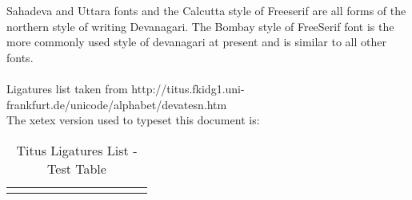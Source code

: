 \documentclass[a4paper,12pt]{memoir}
\begin{document}
\pagestyle{ruled}
\medskip
Sahadeva and Uttara fonts and the Calcutta style of Freeserif are all forms of the northern style  of writing Devanagari.  The Bombay style of FreeSerif font is the more commonly used style of devanagari at present and is similar to all other fonts.\\
\medskip\\
Ligatures list taken from http://titus.fkidg1.uni-frankfurt.de/unicode/alphabet/devatesn.htm
\\
The xetex version used to typeset this document is: \the\XeTeXversion\XeTeXrevision
\\
\begin{longtable}{|l|c|c|c|c|c|c|c|c|c|c|}
\caption[FreeSerif Devanagari]{Titus Ligatures List - Test Table} \label{styles_deva} \\
\endhead
\hline 
\endfoot
\hline \hline
\endlastfoot


\end{longtable}
\end{document}
